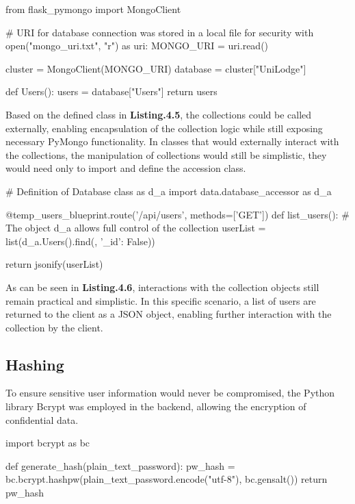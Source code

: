 \begin{python}[caption=Database Accession Class]
from flask_pymongo import MongoClient

# URI for database connection was stored in a local file for security
with open("mongo_uri.txt", "r") as uri:
    MONGO_URI = uri.read()
    
cluster = MongoClient(MONGO_URI)
database = cluster["UniLodge"]

def Users():
    users = database["Users"]
    return users
\end{python}

Based on the defined class in \textbf{Listing.4.5}, the collections could be called externally, enabling encapsulation of the collection logic while still exposing necessary PyMongo functionality. In classes that would externally interact with the collections, the manipulation of collections would still be simplistic, they would need only to import and define the accession class. \newline

\begin{python}[caption=Interacting with Collections]
# Definition of Database class as d_a
import data.database_accessor as d_a

@temp_users_blueprint.route('/api/users', methods=['GET'])
def list_users():
    # The object d_a allows full control of the collection
    userList = list(d_a.Users().find({}, {'_id': False}))

    return jsonify(userList)
\end{python}

As can be seen in \textbf{Listing.4.6}, interactions with the collection objects still remain practical and simplistic. In this specific scenario, a list of users are returned to the client as a JSON object, enabling further interaction with the collection by the client.

\subsection{Hashing}
To ensure sensitive user information would never be compromised, the Python library Bcrypt was employed in the backend, allowing the encryption of confidential data. \newline

\begin{python}[caption=Hashing a Password with Bcrypt]
import bcrypt as bc

def generate_hash(plain_text_password):
    pw_hash = bc.bcrypt.hashpw(plain_text_password.encode("utf-8"), bc.gensalt())
    return pw_hash
\end{python}

